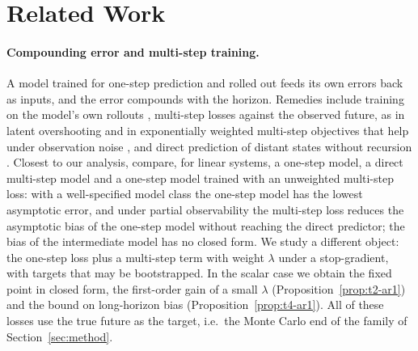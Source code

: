 \section{Related Work}
\label{sec:related}

\paragraph{Compounding error and multi-step training.}
A model trained for one-step prediction and rolled out feeds its own errors back as inputs, and the error compounds with the horizon. Remedies include training on the model's own rollouts \citep{talvitie2014model, venkatraman2015improving}, multi-step losses against the observed future, as in latent overshooting \citep{hafner2019planet} and in exponentially weighted multi-step objectives that help under observation noise \citep{benechehab2024multistep}, and direct prediction of distant states without recursion \citep{lambert2021learning}. Closest to our analysis, \citet{somalwar2025imperfect, somalwar2026statistical} compare, for linear systems, a one-step model, a direct multi-step model and a one-step model trained with an unweighted multi-step loss: with a well-specified model class the one-step model has the lowest asymptotic error, and under partial observability the multi-step loss reduces the asymptotic bias of the one-step model without reaching the direct predictor; the bias of the intermediate model has no closed form. We study a different object: the one-step loss plus a multi-step term with weight $\lambda$ under a stop-gradient, with targets that may be bootstrapped. In the scalar case we obtain the fixed point in closed form, the first-order gain of a small $\lambda$ (Proposition~\ref{prop:t2-ar1}) and the bound on long-horizon bias (Proposition~\ref{prop:t4-ar1}). All of these losses use the true future as the target, i.e.\ the Monte Carlo end of the family of Section~\ref{sec:method}.

